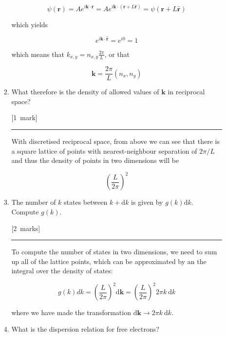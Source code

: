 \documentclass[12pt,a4paper]{article}
\newcommand{\sepline}[0]{\par \hfil\rule{10cm}{0.4pt} \vspace*{\parskip}\hfil}
\begin{document}
\begin{enumerate}
\begin{enumerate}
\begin{enumerate}
\begin{answer}
							$$ \psi(\mathbf{r}) = A e^{i \mathbf{k} \cdot \mathbf{r}} = A e^{i \mathbf{k} \cdot (\mathbf{r} + L\hat{\mathbf{r}})} = \psi(\mathbf{r} + L\hat{\mathbf{r}}) $$

							which yields

							$$ e^{i \mathbf{k} \cdot \hat{\mathbf{r}}} = e^{i0} = 1 $$

							which means that $k_{x,y} = n_{x,y} \frac{2\pi}{L}$, or that

							$$ \mathbf{k} = \frac{2\pi}{L} (n_x, n_y) $$

						\end{answer}

						\item What therefore is the density of allowed values of $\mathbf{k}$ in reciprocal space?

						\hfill{[1~mark]}

						\begin{answer}

							\sepline

							With discretised reciprocal space, from above we can see that there is a square lattice of points with nearest-neighbour separation of $2\pi /L$ and thus the density of points in two dimensions will be

							$$ \left(\frac{L}{2\pi}\right)^2 $$

						\end{answer}

						\item The number of $k$ states between $k + \mathrm{d}k$ is given by $g(k)\mathrm{d}k$. Compute $g(k)$.

						\hfill{[2~marks]}

						\begin{answer}

							\sepline

							To compute the number of states in two dimensions, we need to sum up all of the lattice points, which can be approximated by an the integral over the density of states:

							$$ g(k) dk = \left(\frac{L}{2\pi}\right)^2 \mathrm{d} \mathbf{k} = \left(\frac{L}{2\pi}\right)^2 2\pi k~\mathrm{d} k$$

							where we have made the transformation $\mathrm{d}\mathbf{k} \rightarrow 2\pi k~\mathrm{d}k$.
						\end{answer}

						\item What is the dispersion relation for free electrons?


\end{enumerate}
\end{enumerate}
\end{enumerate}
\end{document}
